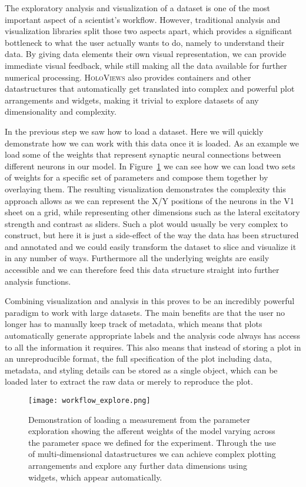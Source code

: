The exploratory analysis and visualization of a dataset is one of the
most important aspect of a scientist's workflow. However, traditional
analysis and visualization libraries split those two aspects apart,
which provides a significant bottleneck to what the user actually
wants to do, namely to understand their data. By giving data elements
their own visual representation, we can provide immediate visual
feedback, while still making all the data available for further
numerical processing. \textsc{HoloViews} also provides containers and
other datastructures that automatically get translated into complex
and powerful plot arrangements and widgets, making it trivial to
explore datasets of any dimensionality and complexity.

In the previous step we saw how to load a dataset.  Here we will
quickly demonstrate how we can work with this data once it is loaded.
As an example we load some of the weights that represent synaptic
neural connections between different neurons in our model. In
Figure~\ref{workflow_explore} we can see how we can load two sets of
weights for a specific set of parameters and compose them together by
overlaying them. The resulting visualization demonstrates the
complexity this approach allows as we can represent the X/Y positions
of the neurons in the V1 sheet on a grid, while representing other
dimensions such as the lateral excitatory strength and contrast as
sliders. Such a plot would usually be very complex to construct, but
here it is just a side-effect of the way the data has been structured
and annotated and we could easily transform the dataset to slice and
visualize it in any number of ways. Furthermore all the underlying
weights are easily accessible and we can therefore feed this data
structure straight into further analysis functions.

Combining visualization and analysis in this proves to be an
incredibly powerful paradigm to work with large datasets. The main
benefits are that the user no longer has to manually keep track of
metadata, which means that plots automatically generate appropriate
labels and the analysis code always has access to all the information
it requires. This also means that instead of storing a plot in an
unreproducible format, the full specification of the plot including
data, metadata, and styling details can be stored as a single object,
which can be loaded later to extract the raw data or merely to
reproduce the plot.

\begin{figure}
	\centering
        \texttt{[image: workflow\_explore.png]}
	\caption[Demonstration of complex parameter exploration in
      \textsc{HoloViews}.]{Demonstration of loading a measurement from
      the parameter exploration showing the afferent weights of the
      model varying across the parameter space we defined for the
      experiment. Through the use of multi-dimensional datastructures
      we can achieve complex plotting arrangements and explore any
      further data dimensions using widgets, which appear
      automatically.}
	\label{workflow_explore}
\end{figure}

